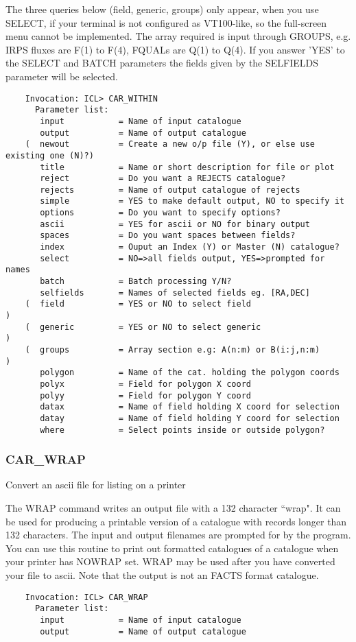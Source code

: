The three queries below (field, generic, groups) only appear, when you use
SELECT, if your terminal is not configured as VT100-like, so the full-screen 
menu cannot be implemented.
The array required is input through GROUPS, e.g. IRPS fluxes are F(1) to 
F(4), FQUALs are Q(1) to Q(4).
If you answer 'YES' to the SELECT and BATCH parameters the fields given by the
SELFIELDS parameter will be selected.

\begin{verbatim}
    Invocation: ICL> CAR_WITHIN
      Parameter list:
       input           = Name of input catalogue
       output          = Name of output catalogue
    (  newout          = Create a new o/p file (Y), or else use existing one (N)?)
       title           = Name or short description for file or plot
       reject          = Do you want a REJECTS catalogue?
       rejects         = Name of output catalogue of rejects
       simple          = YES to make default output, NO to specify it
       options         = Do you want to specify options?
       ascii           = YES for ascii or NO for binary output
       spaces          = Do you want spaces between fields?
       index           = Ouput an Index (Y) or Master (N) catalogue?
       select          = NO=>all fields output, YES=>prompted for names
       batch           = Batch processing Y/N?
       selfields       = Names of selected fields eg. [RA,DEC]
    (  field           = YES or NO to select field                               )
    (  generic         = YES or NO to select generic                             )
    (  groups          = Array section e.g: A(n:m) or B(i:j,n:m)                 )
       polygon         = Name of the cat. holding the polygon coords
       polyx           = Field for polygon X coord
       polyy           = Field for polygon Y coord
       datax           = Name of field holding X coord for selection
       datay           = Name of field holding Y coord for selection
       where           = Select points inside or outside polygon?
\end{verbatim}

\subsubsection{CAR\_WRAP}

Convert an ascii file for listing on a printer

The WRAP command writes an output file with a 132 character ``wrap".  
It can be used for producing a printable version of a catalogue with records 
longer than 132 characters.  
The input and output filenames are prompted for by the program. 
You can use this routine to print out formatted catalogues of a catalogue
when your printer has NOWRAP set.  
WRAP may be used after you have converted your file to ascii.  
Note that the output is not an FACTS format catalogue.
\begin{verbatim}
    Invocation: ICL> CAR_WRAP
      Parameter list:
       input           = Name of input catalogue
       output          = Name of output catalogue
\end{verbatim}
 

